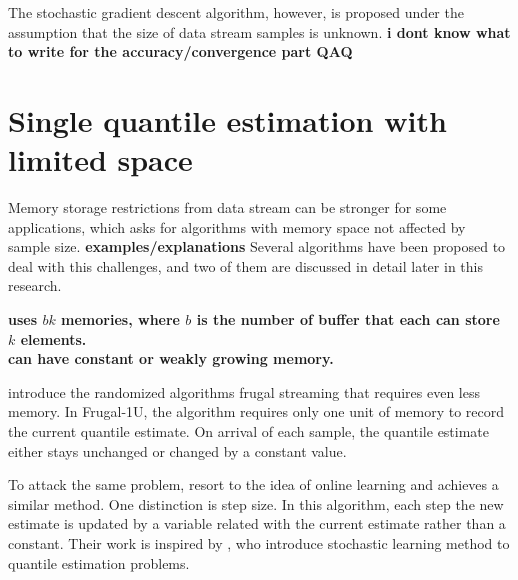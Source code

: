 \documentclass[12pt]{article}
\begin{document}
    The stochastic gradient descent algorithm, however, is proposed under the assumption that the size of data stream samples is unknown. \textbf{i dont know what to write for the accuracy/convergence part QAQ}

    \pagebreak
    \section{Single quantile estimation with limited space}
    Memory storage restrictions from data stream can be stronger for some applications, which asks for algorithms with memory space not affected by sample size. 
    \textbf{examples/explanations}
    Several algorithms have been proposed to deal with this challenges, and two of them are discussed in detail later in this research.
    
    
    \textbf{
    \citeauthor{mankuApproximateMediansOther} \cite{mankuApproximateMediansOther} uses $bk$ memories, where $b$ is the number of buffer that each can store $k$ elements.
    \\
    \citeauthor{dunningComputingExtremelyAccurate2019} \cite{dunningComputingExtremelyAccurate2019} can have constant or weakly growing memory.
    }
    
    \citeauthor{maFrugalStreamingEstimating2014}\cite{maFrugalStreamingEstimating2014} introduce the randomized algorithms frugal streaming that requires even less memory.
    In Frugal-1U, the algorithm requires only one unit of memory to record the current quantile estimate. On arrival of each sample, the quantile estimate either stays unchanged or changed by a constant value. 
    
    To attack the same problem, \citeauthor{yazidiQuantileEstimationDynamic2016}\cite{yazidiQuantileEstimationDynamic2016} resort to the idea of online learning and achieves a similar method. 
    One distinction is step size. In this algorithm, each step the new estimate is updated by a variable related with the current estimate rather than a constant.
    Their work is inspired by \citeauthor{tierneySpaceEfficientRecursiveProcedure1983}\cite{tierneySpaceEfficientRecursiveProcedure1983}, who introduce stochastic learning method to quantile estimation problems. 
\end{document}
